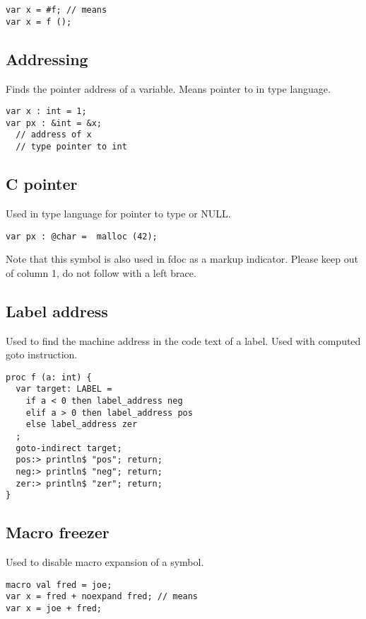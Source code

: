 \documentclass[oneside]{book}
\begin{document}
\begin{verbatim}
var x = #f; // means
var x = f ();
\end{verbatim}


\subsection{Addressing}
Finds the pointer address of a variable.
Means pointer to in type language.

\begin{verbatim}
var x : int = 1;
var px : &int = &x; 
  // address of x
  // type pointer to int
\end{verbatim}


\subsection{C pointer}
Used in type language for pointer to type or NULL.

\begin{verbatim}
var px : @char =  malloc (42);
\end{verbatim}


Note that this symbol is also used in fdoc as a markup
indicator. Please keep out of column 1, do not follow
with a left brace.

\subsection{Label address}
Used to find the machine address in the code text of
a label. Used with computed goto instruction.

\begin{verbatim}
proc f (a: int) {
  var target: LABEL = 
    if a < 0 then label_address neg
    elif a > 0 then label_address pos
    else label_address zer
  ;
  goto-indirect target;
  pos:> println$ "pos"; return;
  neg:> println$ "neg"; return;
  zer:> println$ "zer"; return;
}
\end{verbatim}


\subsection{Macro freezer}
Used to disable macro expansion of a symbol.

\begin{verbatim}
macro val fred = joe;
var x = fred + noexpand fred; // means
var x = joe + fred;
\end{verbatim}
\end{document}
